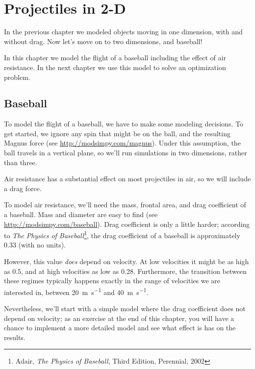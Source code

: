 \documentclass[12pt]{book}
\theoremstyle{exercise}
\begin{document}
\chapter{Projectiles in 2-D}
\label{chap22}

In the previous chapter we modeled objects moving in one dimension, with and without drag.  Now let's move on to two dimensions, and baseball!

In this chapter we model the flight of a baseball including the effect of air resistance.  In the next chapter we use this model to solve an optimization problem.


\section{Baseball}
\label{baseball}

To model the flight of a baseball, we have to make some modeling decisions.  To get started, we ignore any spin that might be on the ball, and the resulting Magnus force (see \url{http://modsimpy.com/magnus}).  Under this assumption, the ball travels in a vertical plane, so we'll run simulations in two dimensions, rather than three.


Air resistance has a substantial effect on most projectiles in air, so we will include a drag force.


To model air resistance, we'll need the mass, frontal area, and drag coefficient of a baseball.  Mass and diameter are easy to find (see \url{http://modsimpy.com/baseball}).  Drag coefficient is only a little harder; according to {\it The Physics of Baseball}\footnote{Adair, {\it The Physics of Baseball}, Third Edition, Perennial, 2002}, the drag coefficient of a baseball is approximately 0.33 (with no units).


However, this value {\em does} depend on velocity.  At low velocities it might be as high as 0.5, and at high velocities as low as 0.28.  Furthermore, the transition between these regimes typically happens exactly in the range of velocities we are interested in, between \SI{20}{\meter\per\second} and \SI{40}{\meter\per\second}.

Nevertheless, we'll start with a simple model where the drag coefficient does not depend on velocity; as an exercise at the end of this chapter, you will have a chance to implement a more detailed model and see what effect is has on the results.
\end{document}
